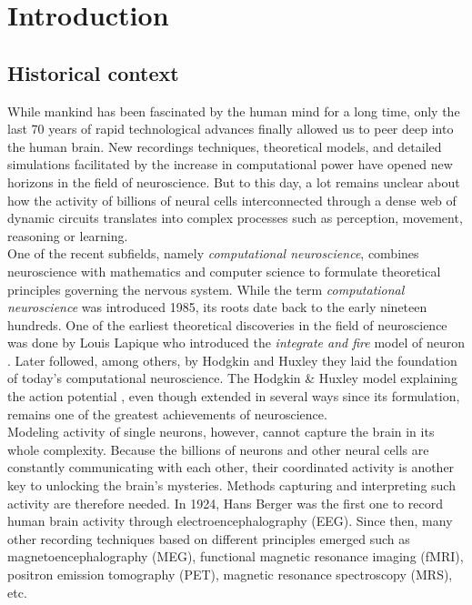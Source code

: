 
\chapter{Introduction}
\label{chap:intr}

\section*{Historical context}
While mankind has been fascinated by the human mind for a long time, only the last 70 years of rapid technological advances finally allowed us to peer deep into the human brain.
New recordings techniques, theoretical models, and detailed simulations facilitated by the increase in computational power have opened new horizons in the field of neuroscience.
But to this day, a lot remains unclear about how the activity of billions of neural cells interconnected through a dense web of dynamic circuits translates into complex processes such as perception, movement, reasoning or learning.  \\

One of the recent subfields, namely \textit{computational neuroscience}, combines neuroscience with mathematics and computer science to formulate theoretical principles governing the nervous system. 
While the term \textit{computational neuroscience} was introduced 1985, its roots date back to the early nineteen hundreds. 
One of the earliest theoretical discoveries in the field of neuroscience was done by Louis Lapique who introduced the \textit{integrate and fire} model of neuron \cite{lapique-1907}.
Later followed, among others, by Hodgkin and Huxley they laid the foundation of today's computational neuroscience.
The Hodgkin \& Huxley model explaining the action potential \cite{hodgkin1952quantitative}, even though extended in several ways since its formulation, remains one of the greatest achievements of neuroscience. \\

Modeling activity of single neurons, however, cannot capture the brain in its whole complexity.
Because the billions of neurons and other neural cells are constantly communicating with each other, their coordinated activity is another key to unlocking the brain’s mysteries.
Methods capturing and interpreting such activity are therefore needed.
In 1924, Hans Berger was the first one to record human brain activity through electroencephalography (EEG).
Since then, many other recording techniques based on different principles emerged such as magnetoencephalography (MEG), functional magnetic resonance imaging (fMRI), positron emission tomography (PET), magnetic resonance spectroscopy (MRS), etc.  \\

